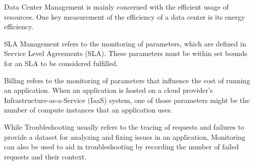 

Data Center Management is mainly concerned with the efficient usage of resources.
One key measurement of the efficiency of a data center is its energy efficiency.

SLA Management refers to the monitoring of parameters, which are defined in Service Level Agreements (SLA).
These parameters must be within set bounds for an SLA to be considered fulfilled.

Billing refers to the monitoring of parameters that influence the cost of running an application.
When an application is hosted on a cloud provider's Infrastructure-as-a-Service (IaaS) system,
one of those parameters might be the number of compute instances that an application uses.

While Troubleshooting usually refers to the tracing of requests and failures to provide a dataset for analyzing and fixing issues in an application,
Monitoring can also be used to aid in troubleshooting by recording the number of failed requests and their context.


